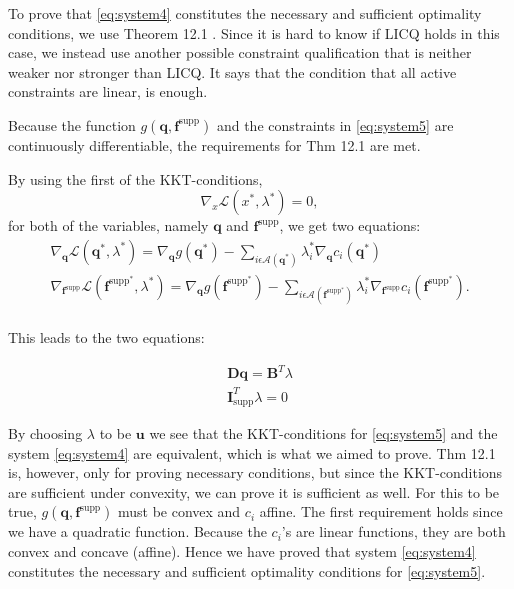 To prove that \eqref{eq:system4} constitutes the necessary and sufficient optimality conditions, we use Theorem 12.1 \cite{NW}. Since it is hard to know if LICQ holds in this case, we instead use another possible constraint qualification that is neither weaker nor stronger than LICQ. It says that the condition that all active constraints are linear, is enough. 

Because the function $g(\bm{q},\bm{f}^{\textrm{supp}})$ and the constraints in \eqref{eq:system5} are continuously differentiable, the requirements for Thm 12.1 are met.

By using the first of the KKT-conditions,
\begin{equation}
\nabla_{x}\mathcal{L}(x^{\ast},\lambda^{\ast}) = 0,
\end{equation}
for both of the variables, namely $\bm{q}$ and $\bm{f}^{\textrm{supp}}$, we get two equations:
\begin{equation}
\begin{aligned}
\nabla_{\bm{q}}\mathcal{L}(\bm{q}^{\ast},\lambda^{\ast}) = \nabla_{\bm{q}}g(\bm{q^{\ast}}) - \sum_{i\epsilon\mathcal{A}(\bm{q}^{\ast})}\lambda_{i}^{\ast}\nabla_{\bm{q}}c_{i}(\bm{q}^{\ast}) \\
\nabla_{\bm{f}^{\textrm{supp}}}\mathcal{L}(\bm{f}^{\textrm{supp}^{\ast}}, \lambda^{\ast}) = \nabla_{\bm{q}}g(\bm{f}^{\textrm{supp}^{\ast}}) - \sum_{i\epsilon\mathcal{A}(\bm{f}^{\textrm{supp}^{\ast}})}\lambda_{i}^{\ast}\nabla_{\bm{f}^{\textrm{supp}}}c_{i}(\bm{f}^{\textrm{supp}^{\ast}}).\\
\end{aligned}
\end{equation}

This leads to the two equations:

\begin{equation}
\begin{aligned}
\bm{Dq} = \bm{B}^{T}\lambda\\
\bm{I}^{T}_{\textrm{supp}}\lambda = 0
\end{aligned}
\end{equation}

By choosing $\lambda$ to be $\bm{u}$ we see that the KKT-conditions for \eqref{eq:system5} and the system \eqref{eq:system4} are equivalent, which is what we aimed to prove. Thm 12.1 is, however, only for proving necessary conditions, but since the KKT-conditions are sufficient under convexity, we can prove it is sufficient as well. For this to be true, $g(\bm{q},\bm{f}^{\textrm{supp}})$ must be convex and $c_{i}$ affine. The first requirement holds since we have a quadratic function. Because the $c_{i}$'s are linear functions, they are both convex and concave (affine). Hence we have proved that system \eqref{eq:system4} constitutes the necessary and sufficient optimality conditions for \eqref{eq:system5}.